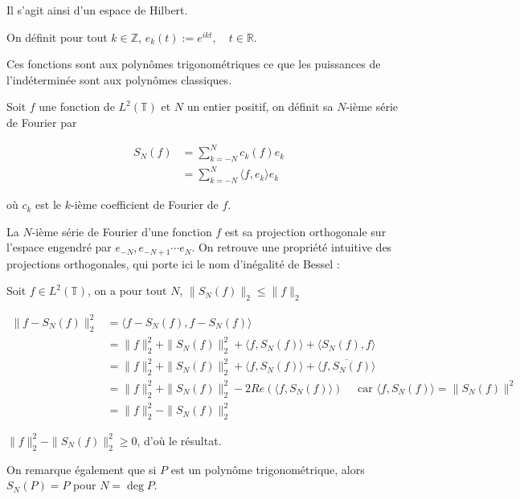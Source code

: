 		 Il s'agit ainsi d'un espace de Hilbert.
		 
		\begin{mydef}
			On définit pour tout $k \in \mathbb{Z}$,  $e_k(t):=e^{ikt}, \quad t\in \mathbb{R}.$	
		\end{mydef}
		
		Ces fonctions sont aux polynômes trigonométriques ce que les puissances de l'indéterminée sont aux polynômes classiques.
		
		\begin{mydef}
			Soit $f$ une fonction de $L^2(\mathbb{T})$ et $N$ un entier positif, on définit sa $N$-ième série de Fourier par
			
			\begin{align*}
				S_N(f) &= \sum_{k = -N}^N c_k(f) e_k \\
				&= \sum_{k = -N}^N \langle f, e_k \rangle e_k
			\end{align*}
			
			où $c_k$ est le $k$-ième coefficient de Fourier de $f$.
		\end{mydef}

		La $N$-ième série de Fourier d'une fonction $f$ est sa projection orthogonale sur l'espace engendré par $e_{-N}, e_{-N+1} \cdots e_N$. On retrouve une propriété intuitive des projections orthogonales, qui porte ici le nom d'inégalité de Bessel :
		
		\begin{mythm}
			Soit $f \in L^2(\mathbb{T})$, on a pour tout $N$, $\|S_N(f)\|_2 \leqslant \|f\|_2$
		\end{mythm}
		
		\begin{myproof}
			\begin{align*}
				\| f - S_N(f) \|^2_2 &= \langle f - S_N(f), f -S_N(f) \rangle \\
									 & = \| f \|^2_2 + \| S_N(f)\|^2_2 + \langle f, S_N(f) \rangle + \langle S_N(f), f \rangle \\ 
									 & = \| f \|^2_2 + \| S_N(f)\|^2_2 + \langle f, S_N(f) \rangle + \overline {\langle  f, S_N(f)\rangle } \\
									 &= \| f \|^2_2 + \| S_N(f)\|^2_2 - 2Re (\langle f, S_N(f) \rangle) \quad \text{ car } \langle f, S_N(f) \rangle = \| S_N(f)\|^2 \\
									 &=  \| f \|^2_2 - \| S_N(f)\|^2_2
			\end{align*}
			
			$\| f \|^2_2 - \| S_N(f)\|^2_2 \geqslant 0$, d'où le résultat.
			\cqfd
		\end{myproof}
			On remarque également que si $P$ est un polynôme trigonométrique, alors $S_N(P) = P$ pour $N = \deg P$. 
			
